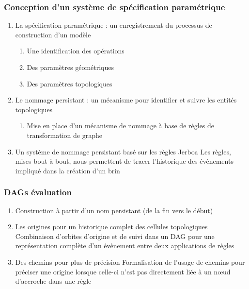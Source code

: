 \documentclass[11pt]{article}
\begin{document}
\subsubsection{Conception d'un système de spécification paramétrique}
\label{sec:org71f29e0}
\begin{enumerate}
\item La spécification paramétrique : un enregistrement du processus de construction d'un modèle
\label{sec:org39b7fd8}
\begin{enumerate}
\item Une identification des opérations
\label{sec:orgfd8d64c}
\item Des paramètres géométriques
\label{sec:orgf7ec21a}
\item Des paramètres topologiques
\label{sec:org74ffa3d}
\end{enumerate}
\item Le nommage persistant : un mécanisme pour identifier et suivre les entités topologiques
\label{sec:orgf32fb09}
\begin{enumerate}
\item Mise en place d'un mécanisme de nommage à base de règles de transformation de graphe
\label{sec:org5fa9adc}
\end{enumerate}
\item Un système de nommage persistant basé sur les règles Jerboa
\label{sec:orgfe2f539}
Les règles, mises bout-à-bout, nous permettent de tracer l'historique des
évènements impliqué dans la création d'un brin
\end{enumerate}
\subsubsection{DAGs évaluation}
\label{sec:org3ea6401}
\begin{enumerate}
\item Construction à partir d'un nom persistant (de la fin vers le début)
\label{sec:org165efbe}
\item Les origines pour un historique complet des cellules topologiques
\label{sec:org95918f8}
Combinaison d'orbites d'origine et de suivi dans un DAG pour une représentation
complète d'un évènement entre deux applications de règles
\item Des chemins pour plus de précision
\label{sec:org190303a}
Formalisation de l'usage de chemins pour préciser une origine lorsque celle-ci
n'est pas directement liée à un nœud d'accroche dans une règle
\end{enumerate}
\end{document}
